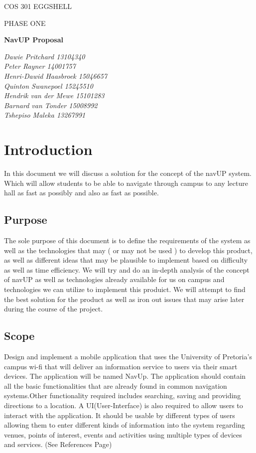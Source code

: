 \documentclass{article}
\begin{document}
\begin{titlepage}
	\centering
	{\scshape\LARGE COS 301 EGGSHELL   \par}
	\vspace{1cm}
	{\scshape\Large PHASE ONE \par}
	\vspace{1.5cm}
	{\huge\bfseries NavUP Proposal\par}
	\vspace{2cm}
	{\Large\itshape  Dawie Pritchard 13104340 \\ Peter Rayner 14001757 \\ Henri-Dawid Haasbroek 15046657 \\ Quinton Swanepoel 15245510 \\ Hendrik van der Mewe 15101283 \\ Barnard van Tonder 15008992 \\ Tshepiso Maleka 13267991\par}
	
\end{titlepage}

\tableofcontents

\newpage
\centering
\section{Introduction}
In this document we will discuss a solution for the concept of the navUP system. Which will allow students to be able to navigate through campus to any lecture hall as fast as possibly and also as fast as possible.
\subsection {Purpose}
The sole purpose of this document is to define the requirements of the system as well as the technologies that may ( or may not be used ) to develop this product, as well as different ideas that may be plausible to implement based on difficulty as well as time efficiency. We will try and do an in-depth analysis of the concept of navUP as well as technologies already available for us on campus and technologies we can utilize to implement this produict. We will attempt to find the best solution for the product as well as iron out issues that may arise later during the course of the project. 
\subsection {Scope}
Design and implement a mobile application that uses the University of Pretoria's campus wi-fi that will deliver an information service to users via their smart devices. The application will be named NavUp. The application should contain all the basic functionalities that are already found in common navigation systems.Other functionality required includes searching, saving and providing directions to a location. A UI(User-Interface) is also required to allow users to interact with the application. It should be usable by different types of users allowing them to enter different kinds of information into the system regarding venues, points of interest, events and activities using multiple types of devices and services. (See References Page)
\end{document}
